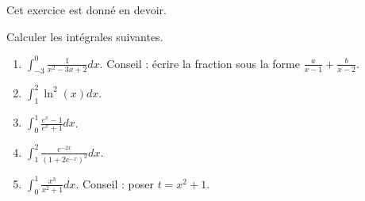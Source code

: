 
\begin{exercice}\label{exoTD5-0003}

  \begin{remark}
    Cet exercice est donné en devoir.
  \end{remark}

	Calculer les intégrales suivantes.
	
	\begin{multicols}{2}
          \begin{enumerate}
	  \item
	    $\displaystyle\int_{-3}^0\frac{1}{ x^2-3x+2 }dx$. Conseil : écrire la fraction sous la forme $\frac{ a }{ x-1 }+\frac{ b }{ x-2 }$.
	  \item
	    $\displaystyle\int_1^2\ln^2(x)dx$.
	  \item
	    $\displaystyle\int_0^1\frac{ e^x-1 }{ e^x+1 }dx$.
	  \item
	    $\displaystyle\int_1^2\frac{  e^{-2x} }{ (1+2 e^{-x})^2 }dx$.
	  \item
	    $\displaystyle\int_0^1\frac{ x^3 }{ x^2+1 }dx$. Conseil : poser $t=x^2+1$.
	  \end{enumerate}
	  
        \end{multicols}

\end{exercice}
